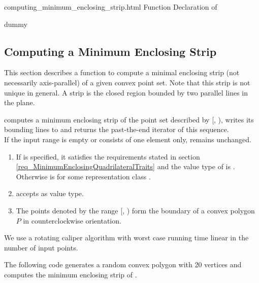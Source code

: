 \ccHtmlNoClassToc
\begin{ccHtmlClassFile}{computing_minimum_enclosing_strip.html}
  {Function Declaration of }
  \ccHtmlNoClassIndex\ccHtmlNoClassLinks
  \begin{ccClass}{dummy}
    \ccHtmlNoIndex\subsection{Computing a Minimum Enclosing Strip}
  \label{secMinimumEnclosingStrip}
  \end{ccClass}
  
  This section describes a function to compute a minimal enclosing
  strip (not necessarily axis-parallel) of a given convex point set.
  Note that this strip is not unique in general. A strip is the closed
  region bounded by two parallel lines in the plane.


  \def\ccLongParamLayout{\ccTrue} 
  
  
  computes a minimum enclosing strip of the point set described by
  [, ), writes its bounding lines to
   and returns the past-the-end iterator of this sequence.\\
  If the input range is empty or consists of one element only, 
  remains unchanged.
  
  \begin{enumerate}
  \item If  is specified, it satisfies the requirements
    stated in section \ref{req_MinimumEnclosingQuadrilateralTraits}
    and the value type  of  is
    . Otherwise  is
     for some representation class .
  \item {} accepts  as value type.
  \item The points denoted by the range [,
    ) form the boundary of a convex polygon $P$ in
    counterclockwise orientation.
  \end{enumerate}
  
  \ccImplementation We use a rotating caliper algorithm
  \cite{t-sgprc-83} with worst case running time linear in the number
  of input points.
    
  \ccExample The following code generates a random convex polygon
   with 20 vertices and computes the minimum enclosing
  strip of .


\end{ccHtmlClassFile}
    
